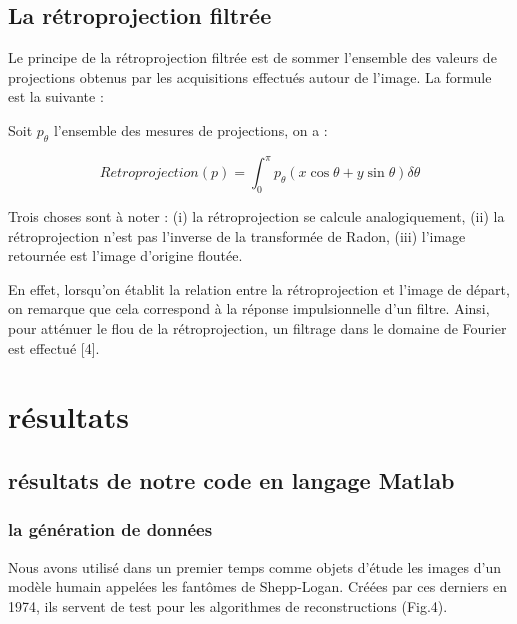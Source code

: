 \documentclass[conference]{IEEEtran}
\begin{document}
\subsection{La rétroprojection filtrée}

Le principe de la rétroprojection filtrée est de sommer l'ensemble des valeurs de projections obtenus par les acquisitions effectués autour de l'image. La formule est la suivante :

Soit $p_\theta$ l'ensemble des mesures de projections, on a :

\[Retroprojection(p)=\int_0^\pi p_\theta(x\cos\theta+y\sin\theta)\delta\theta \]

Trois choses sont à noter : (i) la rétroprojection se calcule analogiquement, (ii) la rétroprojection n'est pas l'inverse de la transformée de Radon, (iii) l'image retournée est l'image d'origine floutée.

 En effet, lorsqu'on établit la relation entre la rétroprojection et l'image de départ, on remarque que cela correspond à la réponse impulsionnelle d'un filtre. Ainsi, pour atténuer le flou de la rétroprojection, un filtrage dans le domaine de Fourier est effectué [4].

\section{résultats }

\subsection{résultats de notre code en langage Matlab}

\subsubsection{la génération de données }

Nous avons utilisé dans un premier temps comme objets d'étude les images d'un modèle humain appelées les fantômes de Shepp-Logan. Créées par ces derniers en 1974, ils servent de test pour les algorithmes de reconstructions (Fig.4).
\end{document}
